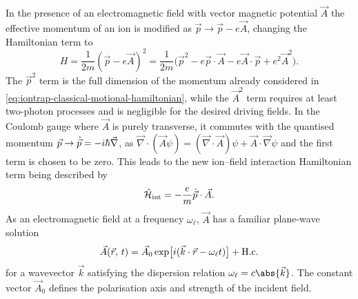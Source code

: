 In the presence of an electromagnetic field with vector magnetic potential $\vec A$ the effective momentum of an ion is modified as $\vec p\to\vec p - e\vec A$, changing the Hamiltonian term to
\begin{equation}
H = \frac1{2m}{(\vec p - e\vec A)}^2
  = \frac1{2m}\bigl(\vec p^2 - e\vec p\cdot\vec A - e\vec A\cdot\vec p + e^2\vec A^2\bigr).
\end{equation}
The $\vec p^2$ term is the full dimension of the momentum already considered in \cref{eq:iontrap-classical-motional-hamiltonian}, while the $\vec A^2$ term requires at least two-photon processes and is negligible for the desired driving fields.
In the Coulomb gauge where $\vec A$ is purely transverse, it commutes with the quantised momentum $\vec p\to\hat{\vec p}=-i\hbar\vec\nabla$, as $\vec\nabla\cdot(\vec A\psi) = (\vec\nabla\cdot\vec A)\psi + \vec A\cdot\vec\nabla\psi$ and the first term is chosen to be zero.
This leads to the new ion--field interaction Hamiltonian term being described by
\begin{equation}
\hat{\mathcal H}_{\text{int}} = -\frac em\hat{\vec p}\cdot\vec A.
\end{equation}
As an electromagnetic field at a frequency $\omega_\ell$, $\vec A$ has a familiar plane-wave solution
\begin{equation}
\vec A(\vec r,\,t) = \vec A_0 \exp\bigl[i(\vec k\cdot\vec r - \omega_\ell t)\bigr] + \text{H.c.}
\end{equation}
for a wavevector $\vec k$ satisfying the dispersion relation $\omega_\ell = c\abs{\vec k}$.
The constant vector $\vec A_0$ defines the polarisation axis and strength of the incident field.

